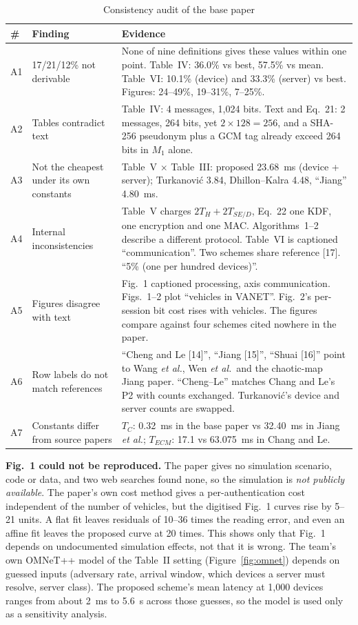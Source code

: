 \documentclass[12pt,a4paper,oneside]{report}
\numberwithin{equation}{chapter}
\begin{document}
\begin{table}[H]
\centering
\caption{Consistency audit of the base paper}
\label{tab:audit}
\small
\begin{tabularx}{\textwidth}{|P{0.06\textwidth}|P{0.3\textwidth}|Y|}
\hline
\textbf{\#} & \textbf{Finding} & \textbf{Evidence}\\ \hline
A1 & 17/21/12\% not derivable & None of nine definitions gives these values within one point. Table~IV: 36.0\% vs best, 57.5\% vs mean. Table~VI: 10.1\% (device) and 33.3\% (server) vs best. Figures: 24--49\%, 19--31\%, 7--25\%.\\ \hline
A2 & Tables contradict text & Table~IV: 4 messages, 1{,}024 bits. Text and Eq.~21: 2 messages, 264 bits, yet $2\times128 = 256$, and a SHA-256 pseudonym plus a GCM tag already exceed 264 bits in $M_1$ alone.\\ \hline
A3 & Not the cheapest under its own constants & Table~V $\times$ Table~III: proposed 23.68~ms (device + server); Turkanovi\'{c} 3.84, Dhillon--Kalra 4.48, ``Jiang'' 4.80~ms.\\ \hline
A4 & Internal inconsistencies & Table~V charges $2T_H+2T_{SE/D}$, Eq.~22 one KDF, one encryption and one MAC. Algorithms~1--2 describe a different protocol. Table~VI is captioned ``communication''. Two schemes share reference [17]. ``5\% (one per hundred devices)''.\\ \hline
A5 & Figures disagree with text & Fig.~1 captioned processing, axis communication. Figs.~1--2 plot ``vehicles in VANET''. Fig.~2's per-session bit cost rises with vehicles. The figures compare against four schemes cited nowhere in the paper.\\ \hline
A6 & Row labels do not match references & ``Cheng and Le [14]'', ``Jiang [15]'', ``Shuai [16]'' point to Wang \emph{et al.}, Wen \emph{et al.}\ and the chaotic-map Jiang paper. ``Cheng--Le'' matches Chang and Le's P2 with counts exchanged. Turkanovi\'{c}'s device and server counts are swapped.\\ \hline
A7 & Constants differ from source papers & $T_C$: 0.32~ms in the base paper vs 32.40~ms in Jiang \emph{et al.}; $T_{ECM}$: 17.1 vs 63.075~ms in Chang and Le.\\ \hline
\end{tabularx}
\end{table}

\textbf{Fig.~1 could not be reproduced.} The paper gives no simulation scenario, code or data, and two web searches found none, so the simulation is \emph{not publicly available}. The paper's own cost method gives a per-authentication cost independent of the number of vehicles, but the digitised Fig.~1 curves rise by 5--21 units. A flat fit leaves residuals of 10--36 times the reading error, and even an affine fit leaves the proposed curve at 20 times. This shows only that Fig.~1 depends on undocumented simulation effects, not that it is wrong. The team's own OMNeT++ model of the Table~II setting (Figure~\ref{fig:omnet}) depends on guessed inputs (adversary rate, arrival window, which devices a server must resolve, server class). The proposed scheme's mean latency at 1{,}000 devices ranges from about 2~ms to 5.6~s across those guesses, so the model is used only as a sensitivity analysis.
\end{document}
